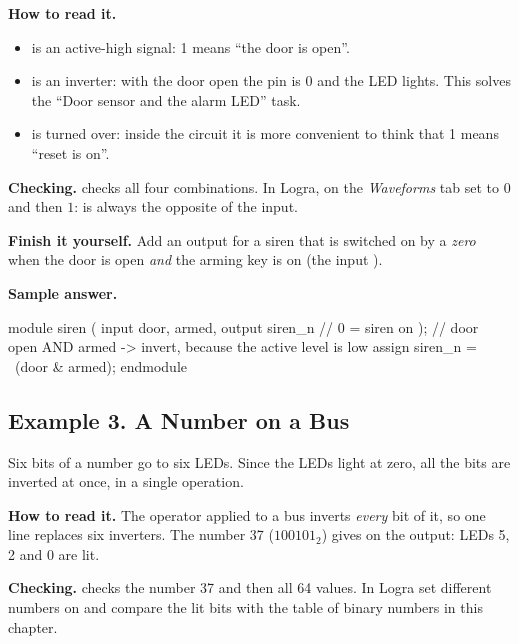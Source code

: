 
\textbf{How to read it.}
\begin{itemize}
  \item {} is an active-high signal: 1 means ``the door is open''.
  \item {} is an inverter: with the door open the pin is 0 and the LED lights. This solves the ``Door sensor and the alarm LED'' task.
  \item {} is  turned over: inside the circuit it is more convenient to think that 1 means ``reset is on''.
\end{itemize}
\textbf{Checking.}  checks all four combinations. In
Logra, on the \emph{Waveforms} tab set  to $0$ and then $1$:
 is always the opposite of the input.

\textbf{Finish it yourself.} Add an output  for a siren that is
switched on by a \emph{zero} when the door is open \emph{and} the arming key is
on (the input ).

\textbf{Sample answer.}
\begin{vcode}
module siren (
    input  door, armed,
    output siren_n          // 0 = siren on
);
    // door open AND armed -> invert, because the active level is low
    assign siren_n = ~(door & armed);
endmodule
\end{vcode}

\subsection{Example 3. A Number on a Bus}

Six bits of a number go to six LEDs. Since the LEDs light at zero, all the bits
are inverted at once, in a single operation.


\textbf{How to read it.} The operator \code{\textasciitilde} applied to a bus
inverts \emph{every} bit of it, so one line replaces six inverters. The number
37 ($100101_2$) gives  on the output: LEDs 5, 2 and 0 are lit.

\textbf{Checking.}  checks the number 37 and then all
64 values. In Logra set different numbers on  and compare the lit
bits with the table of binary numbers in this chapter.

